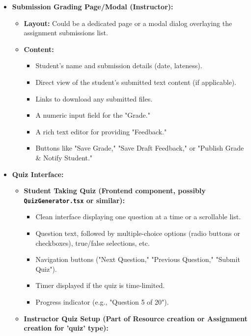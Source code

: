 \begin{itemize}
\begin{itemize}
\begin{itemize}
        \end{itemize}
    \end{itemize}
    \item \textbf{Submission Grading Page/Modal (Instructor):}
    \begin{itemize}
        \item \textbf{Layout:} Could be a dedicated page or a modal dialog overlaying the assignment submissions list.
        \item \textbf{Content:}
        \begin{itemize}
            \item Student's name and submission details (date, lateness).
            \item Direct view of the student's submitted text content (if applicable).
            \item Links to download any submitted files.
            \item A numeric input field for the "Grade."
            \item A rich text editor for providing "Feedback."
            \item Buttons like "Save Grade," "Save Draft Feedback," or "Publish Grade \& Notify Student."
        \end{itemize}
    \end{itemize}
    \item \textbf{Quiz Interface:}
    \begin{itemize}
        \item \textbf{Student Taking Quiz (Frontend component, possibly \texttt{QuizGenerator.tsx} or similar):}
        \begin{itemize}
            \item Clean interface displaying one question at a time or a scrollable list.
            \item Question text, followed by multiple-choice options (radio buttons or checkboxes), true/false selections, etc.
            \item Navigation buttons ("Next Question," "Previous Question," "Submit Quiz").
            \item Timer displayed if the quiz is time-limited.
            \item Progress indicator (e.g., "Question 5 of 20").
        \end{itemize}
        \item \textbf{Instructor Quiz Setup (Part of Resource creation or Assignment creation for 'quiz' type):}
        \begin{itemize}

\end{itemize}
\end{itemize}
\end{itemize}
